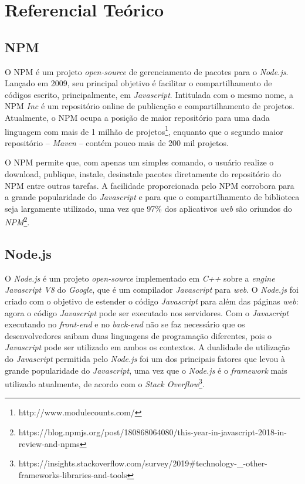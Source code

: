 \chapter{Referencial Teórico}
\label{cap:ref-teorico}

\section{\gls{NPM}}
\label{ref-teo:npm}
O \gls{NPM} é um projeto \textit{open-source} de gerenciamento de pacotes para o \textit{Node.js}. Lançado em 2009, seu principal objetivo é facilitar o compartilhamento de códigos escrito, principalmente, em \textit{Javascript}. Intitulada com o mesmo nome, a \gls{NPM} \textit{Inc} é um repositório online de publicação e compartilhamento de projetos. Atualmente, o \gls{NPM} ocupa a posição de maior repositório para uma dada linguagem com mais de 1 milhão de projetos\footnote{http://www.modulecounts.com/}, enquanto que o segundo maior repositório -- \textit{Maven} -- contém pouco mais de 200 mil  projetos.

O \gls{NPM} permite que, com apenas um simples comando, o usuário realize o download, publique, instale, desinstale pacotes diretamente do repositório do \gls{NPM} entre outras tarefas. A facilidade proporcionada pelo \gls{NPM} corrobora para a grande popularidade do \textit{Javascript} e para que o compartilhamento de biblioteca seja largamente utilizado, uma vez que 97\% dos aplicativos \textit{web} são oriundos do \textit{NPM}\footnote{https://blog.npmjs.org/post/180868064080/this-year-in-javascript-2018-in-review-and-npms}.

\section{Node.js}
\label{ref-teo:node}
O \textit{Node.js} é um projeto \textit{open-source} implementado em \textit{C++} sobre a \textit{engine Javascript V8} do \textit{Google}, que é um compilador \textit{Javascript} para \textit{web}. O \textit{Node.js} foi criado com o objetivo de estender o código \textit{Javascript} para além das páginas \textit{web}: agora o código \textit{Javascript} pode ser executado nos servidores. Com o \textit{Javascript} executando no \textit{front-end} e no \textit{back-end} não se faz necessário que os desenvolvedores saibam duas linguagens de programação diferentes, pois o \textit{Javascript} pode ser utilizado em ambos os contextos. A dualidade de utilização do \textit{Javascript} permitida pelo \textit{Node.js} foi um dos principais fatores que levou à grande popularidade do \textit{Javascript}, uma vez que o \textit{Node.js} é o \textit{framework} mais utilizado atualmente, de acordo com o \textit{Stack Overflow}\footnote{https://insights.stackoverflow.com/survey/2019\#technology-_-other-frameworks-libraries-and-tools}.

